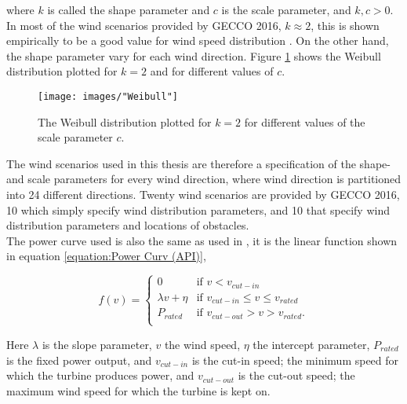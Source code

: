 \noindent where $k$ is called the shape parameter and $c$ is the scale parameter, and $k, c > 0$. In most of the wind scenarios provided by GECCO 2016, $k \approx 2$, this is shown empirically to be a good value for wind speed distribution \citep{Justus}. On the other hand, the shape parameter vary for each wind direction. Figure \ref{figure:weibull distribution} shows the Weibull distribution plotted for $k = 2$ and for different values of $c$. \\


\begin{figure}[h!]
\begin{center}
\texttt{[image: images/"Weibull"]}
\caption{The Weibull distribution plotted for $k = 2$ for different values of the scale parameter $c$.}
\label{figure:weibull distribution}
\end{center}
\end{figure}

\noindent The wind scenarios used in this thesis are therefore a specification of the shape- and scale parameters for every wind direction, where wind direction is partitioned into 24 different directions. Twenty wind scenarios are provided by GECCO 2016, 10 which simply specify wind distribution parameters, and 10 that specify wind distribution parameters and locations of obstacles. \\

\noindent The power curve used is also the same as used in \cite{Kusiak}, it is the linear function shown in equation \ref{equation:Power Curv (API)},

\begin{equation}
 f(v) = 
  \begin{cases} 
   0                                  & \text{if }     v < v_{cut-in} \\
   \lambda v + \eta           & \text{if }     v_{cut-in} \leq v \leq v_{rated} \\
   P_{rated}                        & \text{if }     v_{cut-out} > v > v_{rated}. \\
  \end{cases}
  \label{equation:Power Curv (API)}
\end{equation}

\noindent Here $\lambda$ is the slope parameter, $v$ the wind speed, $\eta$ the intercept parameter, $P_{rated}$ is the fixed power output, and $v_{cut-in}$ is the cut-in speed; the minimum speed for which the turbine produces power, and $v_{cut-out}$ is the cut-out speed; the maximum wind speed for which the turbine is kept on. 


